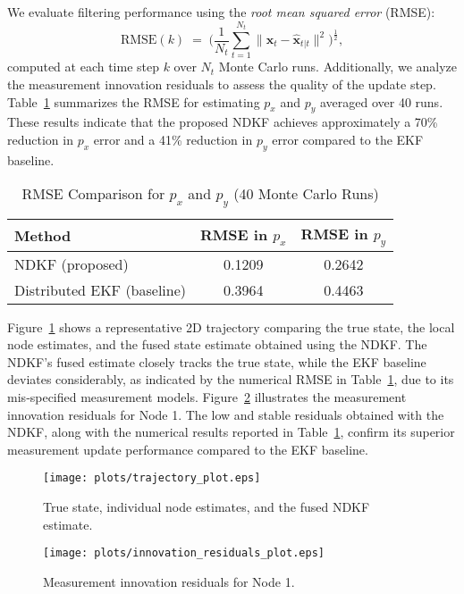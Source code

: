 \documentclass[letterpaper, 10 pt, conference]{ieeeconf}
\begin{document}
We evaluate filtering performance using the \emph{root mean squared error} (RMSE):
\vspace{-4pt}
\begin{equation}
    \mathrm{RMSE}(k) \;=\; \Big(\frac{1}{N_t}\sum_{t=1}^{N_t} \|\mathbf{x}_t - \hat{\mathbf{x}}_{t|t}\|^2\Big)^{\frac{1}{2}},
\end{equation}
computed at each time step $k$ over $N_t$ Monte Carlo runs. Additionally, we analyze the measurement innovation residuals to assess the quality of the update step.
Table~\ref{tab:rmse-comparison} summarizes the RMSE for estimating $p_x$ and $p_y$ averaged over 40 runs.
These results indicate that the proposed NDKF achieves approximately a 70\% reduction in $p_x$ error and a 41\% reduction in $p_y$ error compared to the EKF baseline.

\begin{table}[!ht]
\centering
\caption{RMSE Comparison for $p_x$ and $p_y$ (40 Monte Carlo Runs)}
\label{tab:rmse-comparison}
\begin{tabular}{lcc}
\hline
\textbf{Method} & \textbf{RMSE in $p_x$} & \textbf{RMSE in $p_y$} \\
\hline
NDKF (proposed) & 0.1209 & 0.2642 \\
Distributed EKF (baseline) & 0.3964 & 0.4463 \\
\hline
\end{tabular}
\vspace{-5pt}
\end{table}

Figure~\ref{fig:trajectory} shows a representative 2D trajectory comparing the true state, the local node estimates, and the fused state estimate obtained using the NDKF. The NDKF’s fused estimate closely tracks the true state, while the EKF baseline deviates considerably, as indicated by the numerical RMSE in Table~\ref{tab:rmse-comparison}, due to its mis‑specified measurement models. Figure~\ref{fig:innovation} illustrates the measurement innovation residuals for Node 1. The low and stable residuals obtained with the NDKF, along with the numerical results reported in Table~\ref{tab:rmse-comparison}, confirm its superior measurement update performance compared to the EKF baseline.

\begin{figure}[!tb]
    \centering
    \texttt{[image: plots/trajectory\_plot.eps]}
    \caption{True state, individual node estimates, and the fused NDKF estimate.}
    \label{fig:trajectory}
    \vspace{-10pt}
\end{figure}
\begin{figure}[!tb]
    \centering
    \texttt{[image: plots/innovation\_residuals\_plot.eps]}
    \caption{Measurement innovation residuals for Node 1.}
    \label{fig:innovation}
\end{figure}
\end{document}

